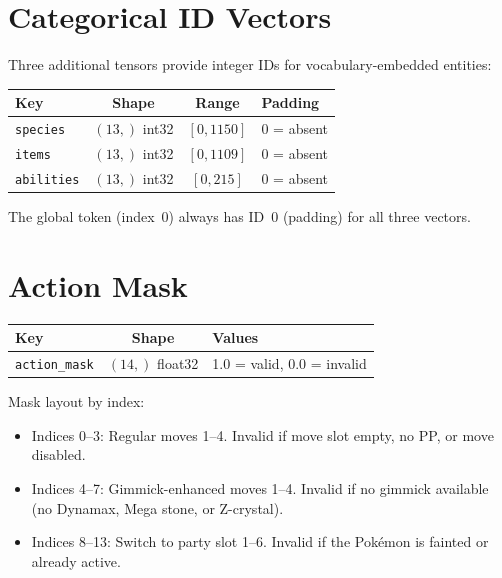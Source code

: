 \section{Categorical ID Vectors}

Three additional tensors provide integer IDs for vocabulary-embedded entities:

\begin{center}
\small
\begin{tabularx}{0.8\textwidth}{l c c l}
  \toprule
  \textbf{Key} & \textbf{Shape} & \textbf{Range} & \textbf{Padding} \\
  \midrule
  \texttt{species}   & $(13,)$ int32 & $[0, 1150]$ & 0 = absent \\
  \texttt{items}     & $(13,)$ int32 & $[0, 1109]$ & 0 = absent \\
  \texttt{abilities} & $(13,)$ int32 & $[0, 215]$  & 0 = absent \\
  \bottomrule
\end{tabularx}
\end{center}

The global token (index~0) always has ID~0 (padding) for all three vectors.

\section{Action Mask}

\begin{center}
\small
\begin{tabularx}{0.8\textwidth}{l c l}
  \toprule
  \textbf{Key} & \textbf{Shape} & \textbf{Values} \\
  \midrule
  \texttt{action\_mask} & $(14,)$ float32 & 1.0 = valid, 0.0 = invalid \\
  \bottomrule
\end{tabularx}
\end{center}

Mask layout by index:
\begin{itemize}
  \item Indices 0--3: Regular moves 1--4.  Invalid if move slot empty, no PP,
        or move disabled.
  \item Indices 4--7: Gimmick-enhanced moves 1--4.  Invalid if no gimmick
        available (no Dynamax, Mega stone, or Z-crystal).
  \item Indices 8--13: Switch to party slot 1--6.  Invalid if the Pok\'{e}mon
        is fainted or already active.
\end{itemize}

